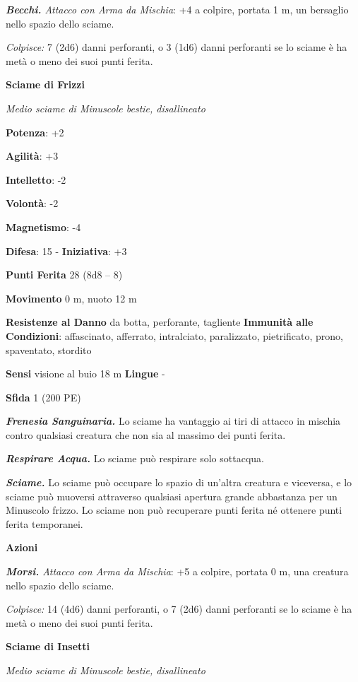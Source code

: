 \begin{multicols}{2}
\emph{\textbf{Becchi.} Attacco con Arma da Mischia}: +4 a colpire,
portata 1 m, un bersaglio nello spazio dello sciame.

\emph{Colpisce:} 7 (2d6) danni perforanti, o 3 (1d6) danni perforanti se
lo sciame è ha metà o meno dei suoi punti ferita.



\textbf{Sciame di Frizzi}

\emph{Medio sciame di Minuscole bestie, disallineato}

\textbf{Potenza}: +2

\textbf{Agilità}: +3

\textbf{Intelletto}: -2

\textbf{Volontà}: -2

\textbf{Magnetismo}: -4

\textbf{Difesa}: 15 - \textbf{Iniziativa}: +3

\textbf{Punti Ferita} 28 (8d8 -- 8)

\textbf{Movimento} 0 m, nuoto 12 m

\textbf{Resistenze al Danno} da botta, perforante, tagliente
\textbf{Immunità alle Condizioni}: affascinato, afferrato, intralciato,
paralizzato, pietrificato, prono, spaventato, stordito

\textbf{Sensi} visione al buio 18 m
\textbf{Lingue} -

\textbf{Sfida} 1 (200 PE)\smallskip

\emph{\textbf{Frenesia Sanguinaria.}} Lo sciame ha vantaggio ai tiri di
attacco in mischia contro qualsiasi creatura che non sia al massimo dei
punti ferita.

\emph{\textbf{Respirare Acqua.}} Lo sciame può respirare solo sottacqua.

\emph{\textbf{Sciame.}} Lo sciame può occupare lo spazio di un'altra
creatura e viceversa, e lo sciame può muoversi attraverso qualsiasi
apertura grande abbastanza per un Minuscolo frizzo. Lo sciame non può
recuperare punti ferita né ottenere punti ferita temporanei.

\smallskip\textbf{Azioni}

\emph{\textbf{Morsi.} Attacco con Arma da Mischia}: +5 a colpire,
portata 0 m, una creatura nello spazio dello sciame.

\emph{Colpisce:} 14 (4d6) danni perforanti, o 7 (2d6) danni perforanti
se lo sciame è ha metà o meno dei suoi punti ferita.

\textbf{Sciame di Insetti}

\emph{Medio sciame di Minuscole bestie, disallineato}


\end{multicols}
